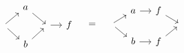 \begin{equation*}
\begin{tikzcd}[row sep=tiny, column sep=small]
& a \arrow{dr} & & \\
\! \arrow{ur} \arrow{dr} & & \! \arrow{r} & f \\
& b \arrow{ur} & &
\end{tikzcd}
\quad = \quad
\begin{tikzcd}[row sep=tiny, column sep=small]
& a \arrow{r} & f \arrow{dr} & \\
\! \arrow{ur} \arrow{dr} & & & \! \\
& b \arrow{r} & f \arrow{ur} &
\end{tikzcd}
\end{equation*}

